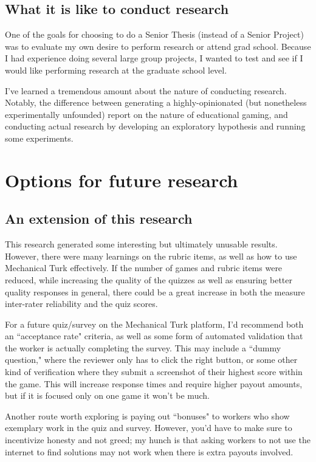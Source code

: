 \documentclass[12pt]{report}
\begin{document}
		\subsection{What it is like to conduct research}
			One of the goals for choosing to do a Senior Thesis (instead of a Senior Project) was to evaluate my own desire to perform research or attend grad school. Because I had experience doing several large group projects, I wanted to test and see if I would like performing research at the graduate school level.

			I've learned a tremendous amount about the nature of conducting research. Notably, the difference between generating a highly-opinionated (but nonetheless experimentally unfounded) report on the nature of educational gaming, and conducting actual research by developing an exploratory hypothesis and running some experiments.

	\section{Options for future research}
		\subsection{An extension of this research}

			This research generated some interesting but ultimately unusable results. However, there were many learnings on the rubric items, as well as how to use Mechanical Turk effectively. If the number of games and rubric items were reduced, while increasing the quality of the quizzes as well as ensuring better quality responses in general, there could be a great increase in both the measure inter-rater reliability and the quiz scores.

			For a future quiz/survey on the Mechanical Turk platform, I'd recommend both an ``acceptance rate" criteria, as well as some form of automated validation that the worker is actually completing the survey. This may include a ``dummy question," where the reviewer only has to click the right button, or some other kind of verification where they submit a screenshot of their highest score within the game. This will increase response times and require higher payout amounts, but if it is focused only on one game it won't be much.

			Another route worth exploring is paying out ``bonuses" to workers who show exemplary work in the quiz and survey. However, you'd have to make sure to incentivize honesty and not greed; my hunch is that asking workers to not use the internet to find solutions may not work when there is extra payouts involved.
\end{document}
